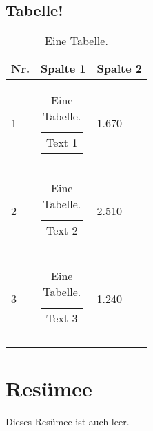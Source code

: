 \documentclass[a4paper,12pt,ngerman,oneside]{scrreprt}	%
\begin{document}
		\section{Tabelle!}
		\begin{footnotesize}
			\begin{longtable}[l]{|l|l|l|}
				\hline
				Nr. & Spalte 1                                                                                                                                                              & Spalte 2 \\ \hline
				\endfirsthead
				\endhead
				1      & \begin{tabular}[t]{@{}l@{}}Text 1\end{tabular}			& 1.670              \\ \hline
				2      & \begin{tabular}[t]{@{}l@{}}Text 2\end{tabular}			& 2.510              \\ \hline
				3      & \begin{tabular}[t]{@{}l@{}}Text 3\end{tabular}			& 1.240              \\ \hline
				\caption{Eine Tabelle.}
			\end{longtable}
		\end{footnotesize}	


		

			
	
	\chapter{Resümee}
	Dieses Resümee ist auch leer.
	
	\begin{sloppypar}
	\cleardoublepage
	\printbibliography[title={Literaturverzeichnis}]
	\end{sloppypar}
	
	
	\cleardoublepage
	\listoffigures
	
	\cleardoublepage
	\listoftables

	

	
	
	
	\printglossary[style=list, type=Abk, nonumberlist]
	\printglossary[style=indexgroup, title=Glossar, nonumberlist]			%
	
\end{document}
